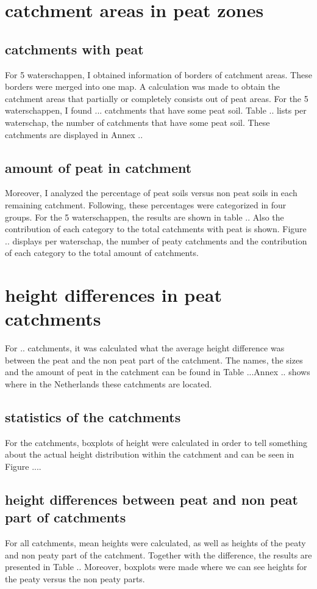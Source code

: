 \documentclass[a4paper,12pt]{scrbook}
\begin{document}
\section{catchment areas in peat zones}

\subsection{catchments with peat}
For 5 waterschappen, I obtained information of borders of catchment areas. These borders were merged into one map. A calculation was made to obtain the catchment areas that partially or completely consists out of peat areas. For the 5 waterschappen, I found ... catchments that have some peat soil. Table .. lists per waterschap, the number of catchments that have some peat soil. These catchments are displayed in Annex .. 

\subsection{amount of peat in catchment}
Moreover, I analyzed the percentage of peat soils versus non peat soils in each remaining catchment. Following, these percentages were categorized in four groups. For the 5 waterschappen, the results are shown in table .. Also the contribution of each category to the total catchments with peat is shown. Figure .. displays per waterschap, the number of peaty catchments and the contribution of each category to the total amount of catchments. 

\section{height differences in peat catchments}
For .. catchments, it was calculated what the average height difference was between the peat and the non peat part of the catchment. The names, the sizes and the amount of peat in the catchment can be found in Table ...Annex .. shows where in the Netherlands these catchments are located.

\subsection{statistics of the catchments}
For the catchments, boxplots of height were calculated in order to tell something about the actual height distribution within the catchment and can be seen in Figure .... 

\subsection{height differences between peat and non peat part of catchments} 
For all catchments, mean heights were calculated, as well as heights of the peaty and non peaty part of the catchment. Together with the difference, the results are presented in Table .. Moreover, boxplots were made where we can see heights for the peaty versus the non peaty parts.
\end{document}
